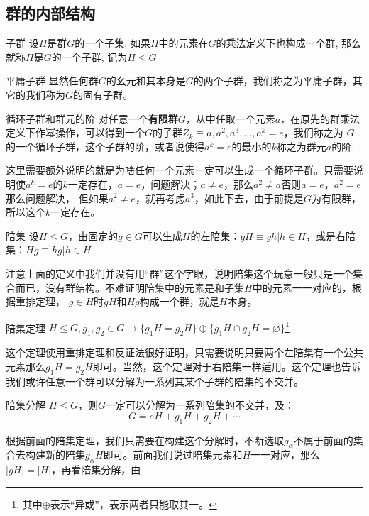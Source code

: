 \subsection{群的内部结构}
\begin{define}{子群}
    设$H$是群$G$的一个子集, 如果$H$中的元素在$G$的乘法定义下也构成一个群, 那么就称$H$是$G$的一个子群, 记为$H\leq G$
\end{define}
\begin{example}{平庸子群}
    显然任何群$G$的幺元和其本身是$G$的两个子群，我们称之为平庸子群，其它的我们称为$G$的固有子群。
\end{example}
\begin{define}{循环子群和群元的阶}
    对任意一个\textbf{有限群}$G$，从中任取一个元素$a$，在原先的群乘法定义下作幂操作，可以得到一个$G$的子群$Z_k\equiv{a,a^2,a^3,\ldots,a^k=e}$，我们称之为
    $G$的一个循环子群，这个子群的阶，或者说使得$a^k=e$的最小的$k$称之为群元$a$的阶.
\end{define}
这里需要额外说明的就是为啥任何一个元素一定可以生成一个循环子群。只需要说明使$a^k=e$的$k$一定存在，$a=e$，问题解决；$a\neq e$，那么$a^2\neq a$否则$a=e$，$a^2=e$那么问题解决，
但如果$a^2\neq e$，就再考虑$a^3$，如此下去，由于前提是$G$为有限群，所以这个$k$一定存在。
\begin{define}{陪集}
    设$H\leq G$，由固定的$g\in G$可以生成$H$的左陪集：$gH\equiv{gh|h\in H}$，或是右陪集：$Hg\equiv{hg|h\in H}$
\end{define}
注意上面的定义中我们并没有用“群”这个字眼，说明陪集这个玩意一般只是一个集合而已，没有群结构。不难证明陪集中的元素是和子集$H$中的元素一一对应的，根据重排定理，
$g\in H$时$gH$和$Hg$构成一个群，就是$H$本身。
\begin{theorem}{陪集定理}
    $H\leq G, g_1,g_2\in G\rightarrow \{g_1H=g_2H\}\oplus \{g_1H \cap g_2H=\varnothing\}$\footnote[0]{其中$\oplus$表示“异或”，表示两者只能取其一。}
\end{theorem}
这个定理使用重排定理和反证法很好证明，只需要说明只要两个左陪集有一个公共元素那么$g_1H=g_2H$即可。当然，这个定理对于右陪集一样适用。这个定理也告诉我们或许任意一个群可以分解为一系列其某个子群的陪集的不交并。
\begin{proposition}{陪集分解}
    $H\leq G$，则$G$一定可以分解为一系列陪集的不交并，及：
    \begin{equation*}
        G=eH+g_1H+g_2H+\cdots
    \end{equation*}
\end{proposition}
根据前面的陪集定理，我们只需要在构建这个分解时，不断选取$g_\alpha$不属于前面的集合去构建新的陪集$g_\alpha H$即可。前面我们说过陪集元素和$H$一一对应，那么$|gH|=|H|$，再看陪集分解，由
